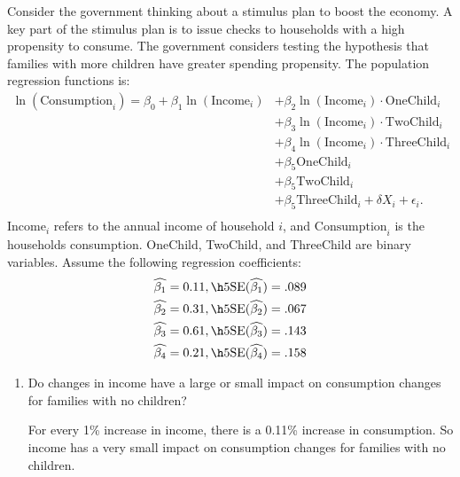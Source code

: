 \documentclass[11pt,twoside,openany]{memoir}
\begin{document}
\begin{question}
    Consider the government thinking about a stimulus plan to boost the economy. A key part of the stimulus plan is to issue checks to households with a high propensity to consume. The government considers testing the hypothesis that families with more children have greater spending propensity. The population regression functions is:
        \begin{equation*}
        \begin{split}
            \ln(\text{Consumption}_i) = \beta_0 + \beta_1 \ln(\text{Income}_i) 
            &+ \beta_2 \ln(\text{Income}_i)\cdot \text{OneChild}_i \\
            &+ \beta_3 \ln(\text{Income}_i)\cdot \text{TwoChild}_i \\
            &+ \beta_4 \ln(\text{Income}_i)\cdot \text{ThreeChild}_i \\
            &+ \beta_5 \text{OneChild}_i \\
            &+ \beta_5 \text{TwoChild}_i \\
            &+ \beta_5 \text{ThreeChild}_i  + \delta X_i + \epsilon_i.\\
        \end{split}
        \end{equation*}
    $\text{Income}_i$ refers to the annual income of household $i$, and $\text{Consumption}_i$ is the households consumption. OneChild, TwoChild, and ThreeChild are binary variables. Assume the following regression coefficients:
        \begin{equation*}
        \begin{split}
            \widehat{\beta_1} = 0.11, \h5 \text{SE}(\widehat{\beta_1}) = .089 \\
            \widehat{\beta_2} = 0.31, \h5 \text{SE}(\widehat{\beta_2}) = .067 \\
            \widehat{\beta_3} = 0.61, \h5 \text{SE}(\widehat{\beta_3}) = .143 \\
            \widehat{\beta_4} = 0.21, \h5 \text{SE}(\widehat{\beta_4}) = .158 \\
        \end{split}
        \end{equation*}
    \begin{enumerate}[label = (\alph*),itemsep=1pt,topsep=3pt]
        \item Do changes in income have a large or small impact on consumption changes for families with no children?
            {\color{blue} \begin{solution}
                For every 1\% increase in income, there is a 0.11\% increase in consumption. So income has a very small impact on consumption changes for families with no children.
            \end{solution}}


\end{enumerate}
\end{question}
\end{document}
